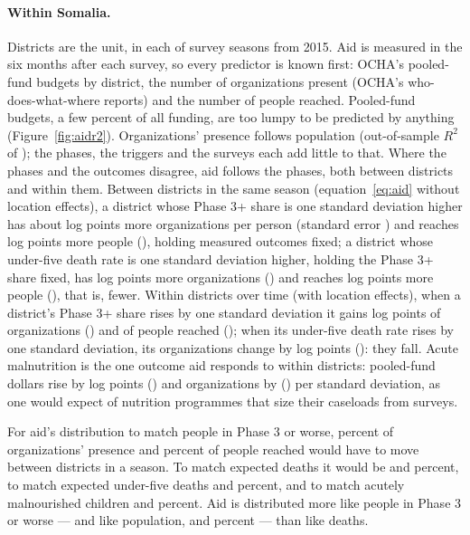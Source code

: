 \documentclass[11pt]{article}
\begin{document}
\paragraph{Within Somalia.} Districts are the unit, in each of \arSomUsdPeriods{} survey seasons from 2015. Aid is measured in the six months after each survey, so every predictor is known first: OCHA's pooled-fund budgets by district, the number of organizations present (OCHA's who-does-what-where reports) and the number of people reached. Pooled-fund budgets, a few percent of all funding, are too lumpy to be predicted by anything (Figure~\ref{fig:aidr2}). Organizations' presence follows population (out-of-sample $R^2$ of \arSomPrtBase{}); the phases, the triggers and the surveys each add little to that. Where the phases and the outcomes disagree, aid follows the phases, both between districts and within them. Between districts in the same season (equation~\ref{eq:aid} without location effects), a district whose Phase 3+ share is one standard deviation higher has about \hrSomPrtPthree{} log points more organizations per person (standard error \hrSomPrtPthreeSe{}) and reaches \hrSomRchPthree{} log points more people (\hrSomRchPthreeSe{}), holding measured outcomes fixed; a district whose under-five death rate is one standard deviation higher, holding the Phase 3+ share fixed, has \hrSomPrtUfive{} log points more organizations (\hrSomPrtUfiveSe{}) and reaches \hrSomRchUfive{} log points more people (\hrSomRchUfiveSe{}), that is, fewer. Within districts over time (with location effects), when a district's Phase 3+ share rises by one standard deviation it gains \hrWSomPrtPthree{} log points of organizations (\hrWSomPrtPthreeSe{}) and \hrWSomRchPthree{} of people reached (\hrWSomRchPthreeSe{}); when its under-five death rate rises by one standard deviation, its organizations change by \hrWSomPrtUfive{} log points (\hrWSomPrtUfiveSe{}): they fall. Acute malnutrition is the one outcome aid responds to within districts: pooled-fund dollars rise by \hrWSomUsdGam{} log points (\hrWSomUsdGamSe{}) and organizations by \hrWSomPrtGam{} (\hrWSomPrtGamSe{}) per standard deviation, as one would expect of nutrition programmes that size their caseloads from surveys.

For aid's distribution to match people in Phase 3 or worse, \disSomPrtPthree{} percent of organizations' presence and \disSomRchPthree{} percent of people reached would have to move between districts in a season. To match expected deaths it would be \disSomPrtDeaths{} and \disSomRchDeaths{} percent, to match expected under-five deaths \disSomPrtUfive{} and \disSomRchUfive{} percent, and to match acutely malnourished children \disSomPrtMaln{} and \disSomRchMaln{} percent. Aid is distributed more like people in Phase 3 or worse --- and like population, \disSomPrtPop{} and \disSomRchPop{} percent --- than like deaths.
\end{document}
